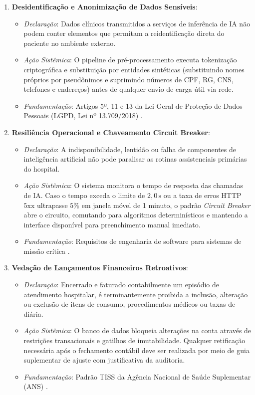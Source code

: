 \begin{enumerate}[label=\textbf{RN-\arabic*:}, leftmargin=*]
    \item \textbf{Desidentificação e Anonimização de Dados Sensíveis}:
    \begin{itemize}[noitemsep]
        \item \textit{Declaração}: Dados clínicos transmitidos a serviços de inferência de IA não podem conter elementos que permitam a reidentificação direta do paciente no ambiente externo.
        \item \textit{Ação Sistêmica}: O pipeline de pré-processamento executa tokenização criptográfica e substituição por entidades sintéticas (substituindo nomes próprios por pseudônimos e suprimindo números de CPF, RG, CNS, telefones e endereços) antes de qualquer envio de carga útil via rede.
        \item \textit{Fundamentação}: Artigos 5º, 11 e 13 da Lei Geral de Proteção de Dados Pessoais (LGPD, Lei nº 13.709/2018) \cite{brasil_lgpd:2018}.
    \end{itemize}

    \item \textbf{Resiliência Operacional e Chaveamento Circuit Breaker}:
    \begin{itemize}[noitemsep]
        \item \textit{Declaração}: A indisponibilidade, lentidão ou falha de componentes de inteligência artificial não pode paralisar as rotinas assistenciais primárias do hospital.
        \item \textit{Ação Sistêmica}: O sistema monitora o tempo de resposta das chamadas de IA. Caso o tempo exceda o limite de $2{,}0\,\text{s}$ ou a taxa de erros HTTP $5\text{xx}$ ultrapasse $5\%$ em janela móvel de 1 minuto, o padrão \textit{Circuit Breaker} abre o circuito, comutando para algoritmos determinísticos e mantendo a interface disponível para preenchimento manual imediato.
        \item \textit{Fundamentação}: Requisitos de engenharia de software para sistemas de missão crítica \cite{sommerville:2019}.
    \end{itemize}

    \item \textbf{Vedação de Lançamentos Financeiros Retroativos}:
    \begin{itemize}[noitemsep]
        \item \textit{Declaração}: Encerrado e faturado contabilmente um episódio de atendimento hospitalar, é terminantemente proibida a inclusão, alteração ou exclusão de itens de consumo, procedimentos médicos ou taxas de diária.
        \item \textit{Ação Sistêmica}: O banco de dados bloqueia alterações na conta através de restrições transacionais e gatilhos de imutabilidade. Qualquer retificação necessária após o fechamento contábil deve ser realizada por meio de guia suplementar de ajuste com justificativa da auditoria.
        \item \textit{Fundamentação}: Padrão TISS da Agência Nacional de Saúde Suplementar (ANS) \cite{ans_tiss:2023}.
    \end{itemize}


\end{enumerate}
